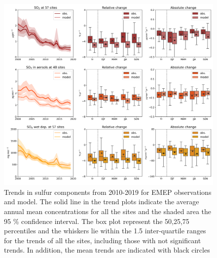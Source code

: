 \begin{figure}
	\centering
	\includegraphics[width=0.74\paperwidth]{FIGS_TRENDS/sulfur_trends.png}
	\caption{\label{fig:SOx_trends}Trends in sulfur components from 2010-2019 for EMEP observations and model. The solid line in the trend plots indicate the average annual mean concentrations for all the sites and the shaded area the 95 \% confidence interval. The box plot represent the 50,25,75 percentiles and the whiskers lie within the 1.5 inter-quartile ranges for the trends of all the sites, including those with not significant trends. In addition, the mean trends are indicated with black circles}
\end{figure}

